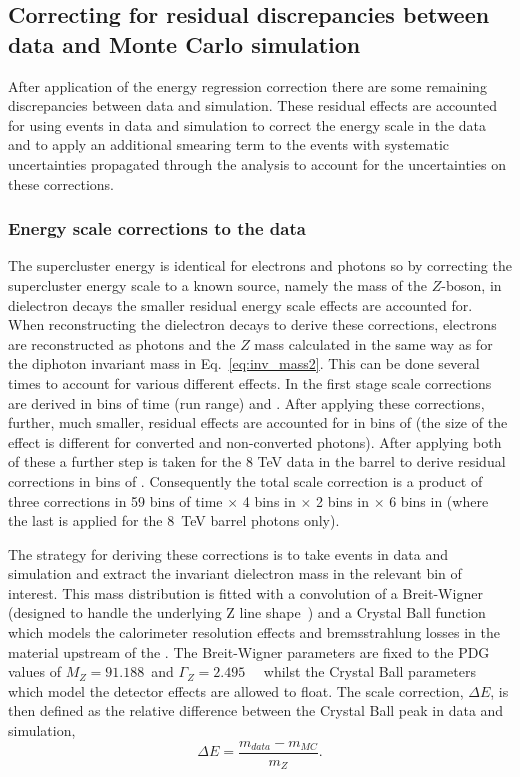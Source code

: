 \subsection{Correcting for residual discrepancies between data and Monte Carlo simulation}
\label{sec:scale_smearing}

After application of the energy regression correction there are some remaining discrepancies between data and \MC simulation. These residual effects are accounted for using \Zee events in data and simulation to correct the energy scale in the data and to apply an additional smearing term to the \MC events with systematic uncertainties propagated through the analysis to account for the uncertainties on these corrections.

\subsubsection{Energy scale corrections to the data}

The supercluster energy is identical for electrons and photons so by correcting the supercluster energy scale to a known source, namely the mass of the $Z$-boson, in dielectron decays the smaller residual energy scale effects are accounted for. When reconstructing the dielectron decays to derive these corrections, electrons are reconstructed as photons and the $Z$ mass calculated in the same way as for the diphoton invariant mass in Eq.~\ref{eq:inv_mass2}. This can be done several times to account for various different effects. In the first stage scale corrections are derived in bins of time (run range) and \eta. After applying these corrections, further, much smaller, residual effects are accounted for in bins of \rnine (the size of the effect is different for converted and non-converted photons). After applying both of these a further step is taken for the 8 TeV data in the barrel to derive residual corrections in bins of \ET. Consequently the total scale correction is a product of three corrections in 59 bins of time $\times$ 4 bins in \eta $\times$ 2 bins in \rnine $\times$ 6 bins in \ET (where the last is applied for the 8~TeV barrel photons only).

The strategy for deriving these corrections is to take \Zee events in data and \MC simulation and extract the invariant dielectron mass in the relevant bin of interest. This mass distribution is fitted with a convolution of a Breit-Wigner (designed to handle the underlying Z line shape~\cite{pdg}) and a Crystal Ball function which models the calorimeter resolution effects and bremsstrahlung losses in the material upstream of the \ECAL. The Breit-Wigner parameters are fixed to the PDG values of $M_{Z}=91.188$~\GeV and $\Gamma_{Z}=2.495$~\GeV~\cite{pdg} whilst the Crystal Ball parameters which model the detector effects are allowed to float. The scale correction, $\Delta E$, is then defined as the relative difference between the Crystal Ball peak in data and simulation,
\begin{equation}
  \Delta E = \frac{m_{data}-m_{MC}}{m_{Z}}.
\end{equation}
